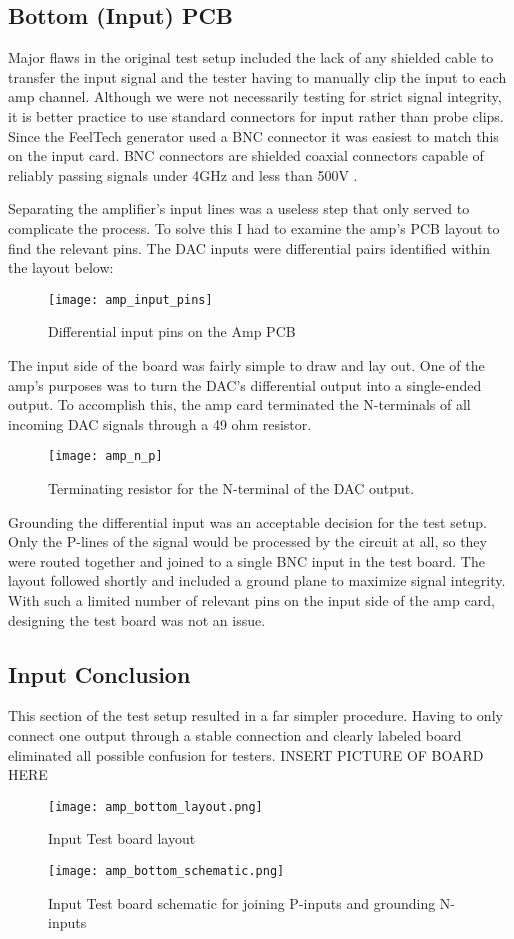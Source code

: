 \subsection{Bottom (Input) PCB}
Major flaws in the original test setup included the lack of any shielded cable to transfer the input signal and the tester having to manually clip the input to each amp channel. Although we were not necessarily testing for strict signal integrity, it is better practice to use standard connectors for input rather than probe clips. Since the FeelTech generator used a BNC connector it was easiest to match this on the input card. BNC connectors are shielded coaxial connectors capable of reliably passing signals under 4GHz and less than 500V \cite{bncbook}. \par
Separating the amplifier's input lines was a useless step that only served to complicate the process. To solve this I had to examine the amp's PCB layout to find the relevant pins. The DAC inputs were differential pairs identified within the layout below:
\begin{figure}[!htb]
	\centering
	\texttt{[image: amp\_input\_pins]}
	\caption{Differential input pins on the Amp PCB}
\end{figure}
The input side of the board was fairly simple to draw and lay out. One of the amp's purposes was to turn the DAC's differential output into a single-ended output. To accomplish this, the amp card terminated the N-terminals of all incoming DAC signals through a 49 ohm resistor.
\begin{figure}[!htb]
	\centering
	\texttt{[image: amp\_n\_p]}
	\caption{Terminating resistor for the N-terminal of the DAC output.}
\end{figure}
Grounding the differential input was an acceptable decision for the test setup. Only the P-lines of the signal would be processed by the circuit at all, so they were routed together and joined to a single BNC input in the test board.
The layout followed shortly and included a ground plane to maximize signal integrity. With such a limited number of relevant pins on the input side of the amp card, designing the test board was not an issue. \par
\subsection{Input Conclusion}
This section of the test setup resulted in a far simpler procedure. Having to only connect one output through a stable connection and clearly labeled board eliminated all possible confusion for testers. INSERT PICTURE OF BOARD HERE
\begin{figure}[!htb]
	\centering
	\texttt{[image: amp\_bottom\_layout.png]}
	\caption{Input Test board layout}
\end{figure}
\begin{figure}[!htb]
	\centering
	\texttt{[image: amp\_bottom\_schematic.png]}
	\caption{Input Test board schematic for joining P-inputs and grounding N-inputs}
\end{figure}

